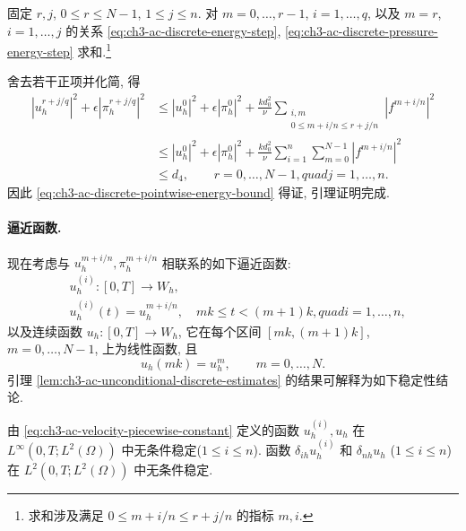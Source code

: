\begin{Proof}
固定 $r,j$, $0\leq r\leq N-1$, $1\leq j\leq n$. 对 $m=0,\ldots,r-1$, $i=1,\ldots,q$, 以及 $m=r$, $i=1,\ldots,j$ 的关系 \eqref{eq:ch3-ac-discrete-energy-step}, \eqref{eq:ch3-ac-discrete-pressure-energy-step} 求和.\footnote{求和涉及满足 $0\leq m+i/n\leq r+j/n$ 的指标 $m,i$.}

\hypertarget{chapter-03-page-318}{}
舍去若干正项并化简, 得
\[
\begin{aligned}
|u_h^{r+j/q}|^2+\epsilon|\pi_h^{r+j/q}|^2
&\leq|u_h^0|^2+\epsilon|\pi_h^0|^2
+\frac{kd_0^2}{\nu}
\sum_{\substack{i,m\\0\leq m+i/n\leq r+j/n}}|f^{m+i/n}|^2\\
&\leq|u_h^0|^2+\epsilon|\pi_h^0|^2
+\frac{kd_0^2}{\nu}\sum_{i=1}^n\sum_{m=0}^{N-1}|f^{m+i/n}|^2\\
&\leq d_4,
\qquad r=0,\ldots,N-1,quad j=1,\ldots,n.
\end{aligned}
\]
因此 \eqref{eq:ch3-ac-discrete-pointwise-energy-bound} 得证, 引理证明完成.
\end{Proof}

\paragraph{逼近函数.}
现在考虑与 $u_h^{m+i/n},\pi_h^{m+i/n}$ 相联系的如下逼近函数:
\begin{equation}
\begin{aligned}
&u_h^{(i)}:[0,T]\longrightarrow W_h,\\
&u_h^{(i)}(t)=u_h^{m+i/n},
\quad mk\leq t<(m+1)k,quad i=1,\ldots,n,
\end{aligned}
\label{eq:ch3-ac-velocity-piecewise-constant}
\end{equation}
以及连续函数 $u_h:[0,T]\to W_h$, 它在每个区间 $[mk,(m+1)k]$, $m=0,\ldots,N-1$, 上为线性函数, 且
\begin{equation}
u_h(mk)=u_h^m,
\qquad m=0,\ldots,N.
\label{eq:ch3-ac-velocity-piecewise-linear}
\end{equation}
引理 \ref{lem:ch3-ac-unconditional-discrete-estimates} 的结果可解释为如下稳定性结论.

\begin{Theorem}
\label{thm:ch3-ac-unconditional-stability}
由 \eqref{eq:ch3-ac-velocity-piecewise-constant} 定义的函数 $u_h^{(i)},u_h$ 在 $L^\infty(0,T;L^2(\Omega))$ 中无条件稳定($1\leq i\leq n$). 函数 $\delta_{ih}u_h^{(i)}$ 和 $\delta_{nh}u_h$ ($1\leq i\leq n$)在 $L^2(0,T;L^2(\Omega))$ 中无条件稳定.
\end{Theorem}

